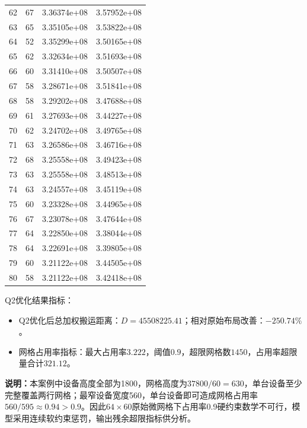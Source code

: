 \documentclass[12pt,a4paper]{article}
\begin{document}
\begin{table}[htbp]
\begin{tabular}{ccc}
		62 & 67 & 3.36374e+08 & 3.57952e+08 \\
		63 & 65 & 3.35105e+08 & 3.53822e+08 \\
		64 & 52 & 3.35299e+08 & 3.50165e+08 \\
		65 & 62 & 3.32634e+08 & 3.51693e+08 \\
		66 & 60 & 3.31410e+08 & 3.50507e+08 \\
		67 & 58 & 3.28671e+08 & 3.51841e+08 \\
		68 & 58 & 3.29202e+08 & 3.47688e+08 \\
		69 & 61 & 3.27693e+08 & 3.44227e+08 \\
		70 & 62 & 3.24702e+08 & 3.49765e+08 \\
		71 & 63 & 3.26586e+08 & 3.46716e+08 \\
		72 & 68 & 3.25558e+08 & 3.49423e+08 \\
		73 & 63 & 3.25558e+08 & 3.48513e+08 \\
		74 & 63 & 3.24557e+08 & 3.45119e+08 \\
		75 & 60 & 3.23328e+08 & 3.44965e+08 \\
		76 & 67 & 3.23078e+08 & 3.47644e+08 \\
		77 & 64 & 3.22850e+08 & 3.38044e+08 \\
		78 & 64 & 3.22691e+08 & 3.39805e+08 \\
		79 & 60 & 3.21122e+08 & 3.44505e+08 \\
		80 & 58 & 3.21122e+08 & 3.42418e+08 \\
		\bottomrule
	\end{tabular}
\end{table}

Q2优化结果指标：
\begin{itemize}
	\item Q2优化后总加权搬运距离：$D=45508225.41$；相对原始布局改善：$-250.74\%$。
	\item 网格占用率指标：最大占用率$3.222$，阈值$0.9$，超限网格数$1450$，占用率超限量合计$321.12$。
\end{itemize}

\textbf{说明：}本案例中设备高度全部为1800，网格高度为$37800/60=630$，单台设备至少完整覆盖两行网格；最窄设备宽度560，单台设备即可造成网格占用率$560/595\approx0.94>0.9$。因此$64\times60$原始微网格下占用率0.9硬约束数学不可行，模型采用连续软约束惩罚，输出残余超限指标供分析。
\end{document}
